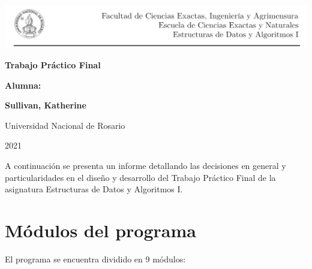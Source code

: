 \documentclass[11pt]{article}
\begin{document}
\begin{titlepage}
    \vspace{-1cm}
    \hspace{-1.2cm}\includegraphics[scale= 0.8]{header2.png}
    \begin{center}
        \vfill
        \vfill
            \vspace{0.7cm}
            \noindent\textbf{\Huge Trabajo Práctico Final}\par
            \vspace{.5cm}
        \vfill
        \noindent \textbf{\huge Alumna:}\par
        \vspace{.5cm}
        \noindent \textbf{\Large Sullivan, Katherine}\par
 
        \vfill
        \large Universidad Nacional de Rosario \par
        \noindent\large 2021
    \end{center}
\end{titlepage}

A continuaci\'on se presenta un informe detallando las decisiones en general y particularidades en el dise\~{n}o y desarrollo 
del Trabajo Pr\'actico Final de la asignatura Estructuras de Datos y Algoritmos I. 

\section{M\'odulos del programa}
El programa se encuentra dividido en 9 m\'odulos:
\end{document}
